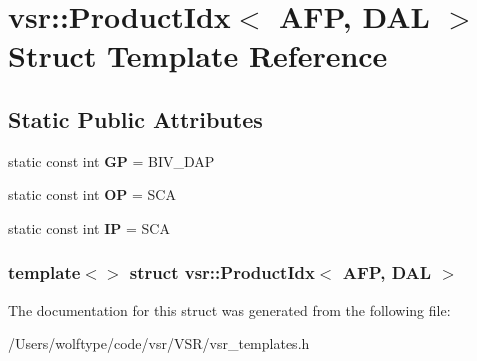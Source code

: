 \hypertarget{structvsr_1_1_product_idx_3_01_a_f_p_00_01_d_a_l_01_4}{\section{vsr\-:\-:Product\-Idx$<$ A\-F\-P, D\-A\-L $>$ Struct Template Reference}
\label{structvsr_1_1_product_idx_3_01_a_f_p_00_01_d_a_l_01_4}
}
\subsection*{Static Public Attributes}
\begin{DoxyCompactItemize}
\item 
\hypertarget{structvsr_1_1_product_idx_3_01_a_f_p_00_01_d_a_l_01_4_ae15a52764f5d73cde1c870997558121e}{static const int {\bfseries G\-P} = B\-I\-V\-\_\-\-D\-A\-P}\label{structvsr_1_1_product_idx_3_01_a_f_p_00_01_d_a_l_01_4_ae15a52764f5d73cde1c870997558121e}

\item 
\hypertarget{structvsr_1_1_product_idx_3_01_a_f_p_00_01_d_a_l_01_4_a2539c90054e4c0d1439305b7fde95f36}{static const int {\bfseries O\-P} = S\-C\-A}\label{structvsr_1_1_product_idx_3_01_a_f_p_00_01_d_a_l_01_4_a2539c90054e4c0d1439305b7fde95f36}

\item 
\hypertarget{structvsr_1_1_product_idx_3_01_a_f_p_00_01_d_a_l_01_4_ad15a51aed56c86829c90253e7c628f9a}{static const int {\bfseries I\-P} = S\-C\-A}\label{structvsr_1_1_product_idx_3_01_a_f_p_00_01_d_a_l_01_4_ad15a51aed56c86829c90253e7c628f9a}

\end{DoxyCompactItemize}
\subsubsection*{template$<$$>$ struct vsr\-::\-Product\-Idx$<$ A\-F\-P, D\-A\-L $>$}



The documentation for this struct was generated from the following file\-:\begin{DoxyCompactItemize}
\item 
/\-Users/wolftype/code/vsr/\-V\-S\-R/vsr\-\_\-templates.\-h\end{DoxyCompactItemize}
